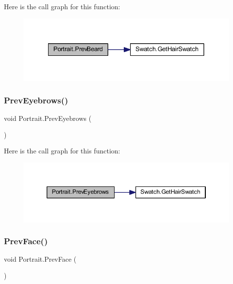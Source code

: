 Here is the call graph for this function\+:
\nopagebreak
\begin{figure}[H]
\begin{center}
\leavevmode
\includegraphics[width=328pt]{class_portrait_ada91686eb3d44e5771a81dc147462258_cgraph}
\end{center}
\end{figure}
\mbox{\label{class_portrait_abce38ec7263bad9ae029b40e585fe6b1}} 
\subsubsection{\texorpdfstring{PrevEyebrows()}{PrevEyebrows()}}
{\footnotesize\ttfamily void Portrait.\+Prev\+Eyebrows (\begin{DoxyParamCaption}{ }\end{DoxyParamCaption})}

Here is the call graph for this function\+:
\nopagebreak
\begin{figure}[H]
\begin{center}
\leavevmode
\includegraphics[width=346pt]{class_portrait_abce38ec7263bad9ae029b40e585fe6b1_cgraph}
\end{center}
\end{figure}
\mbox{\label{class_portrait_aa550ccd7202589090d88e812743da74a}} 
\subsubsection{\texorpdfstring{PrevFace()}{PrevFace()}}
{\footnotesize\ttfamily void Portrait.\+Prev\+Face (\begin{DoxyParamCaption}{ }\end{DoxyParamCaption})}

